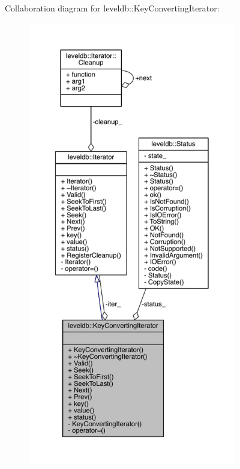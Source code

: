Collaboration diagram for leveldb\+:\+:Key\+Converting\+Iterator\+:\nopagebreak
\begin{figure}[H]
\begin{center}
\leavevmode
\includegraphics[height=550pt]{classleveldb_1_1_key_converting_iterator__coll__graph}
\end{center}
\end{figure}
